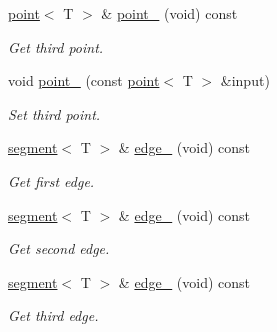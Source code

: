\begin{DoxyCompactItemize}
\mbox{\label{classddd_1_1triangle_a70f56db3d1c602c93615701c9302adaa}} 
\hyperlink{classddd_1_1point}{point}$<$ T $>$ \& \hyperlink{classddd_1_1triangle_a70f56db3d1c602c93615701c9302adaa}{point\+\_} (void) const
\begin{DoxyCompactList}\small\item\em Get third point. \end{DoxyCompactList}\item 
void \hyperlink{classddd_1_1triangle_a3256c2d4f7c6bcc571de9743b4e536e7}{point\+\_} (const \hyperlink{classddd_1_1point}{point}$<$ T $>$ \&input)
\begin{DoxyCompactList}\small\item\em Set third point. \end{DoxyCompactList}\item 
\mbox{\label{classddd_1_1triangle_a305f3bc2ab0c875b734869d7f3a7d5b9}} 
\hyperlink{classddd_1_1segment}{segment}$<$ T $>$ \& \hyperlink{classddd_1_1triangle_a305f3bc2ab0c875b734869d7f3a7d5b9}{edge\+\_} (void) const
\begin{DoxyCompactList}\small\item\em Get first edge. \end{DoxyCompactList}\item 
\mbox{\label{classddd_1_1triangle_a17963443fa01b119843857f718eac112}} 
\hyperlink{classddd_1_1segment}{segment}$<$ T $>$ \& \hyperlink{classddd_1_1triangle_a17963443fa01b119843857f718eac112}{edge\+\_} (void) const
\begin{DoxyCompactList}\small\item\em Get second edge. \end{DoxyCompactList}\item 
\mbox{\label{classddd_1_1triangle_ad59fa6ccce745b9062f7b4f6ba46a137}} 
\hyperlink{classddd_1_1segment}{segment}$<$ T $>$ \& \hyperlink{classddd_1_1triangle_ad59fa6ccce745b9062f7b4f6ba46a137}{edge\+\_} (void) const
\begin{DoxyCompactList}\small\item\em Get third edge. \end{DoxyCompactList}\item 
\mbox{\label{classddd_1_1triangle_a1a45e08178b427aec00868271f664273}} 

\end{DoxyCompactItemize}
